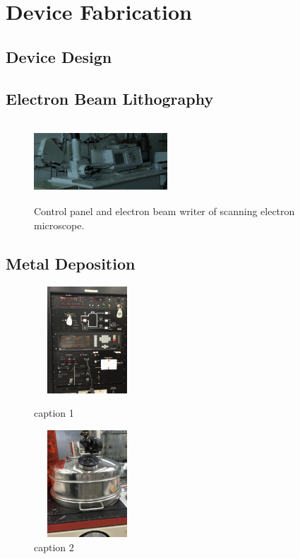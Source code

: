 \section{Device Fabrication}\label{sec:device_fabrication}
\subsection{Device Design}\label{subsec:device_design}
\subsection{Electron Beam Lithography}\label{subsec:lithography}
\begin{figure}[ht]
	\centering
	\includegraphics[height=3cm,width=5cm]{figs/experimental/SEM}
	\caption[Scanning electron microscope]{Control panel and electron beam writer of scanning electron microscope.}
	\label{fig:SEM_machine}
\end{figure}

\subsection{Metal Deposition}\label{subsec:deposition}
\begin{figure}[ht]
	\centering
	\begin{minipage}[b]{0.45\linewidth}
		\centering
		\includegraphics[height=4cm,width=4cm]{figs/experimental/bjd_control_panel}
		\caption[BJD control panel]{caption 1}
		\label{fig:bjd_control_panel}
	\end{minipage}
	\qquad
	\begin{minipage}[b]{0.45\linewidth}
		\centering
		\includegraphics[height=4cm,width=4cm]{figs/experimental/bjd_hood}
		\caption[BJD Hood]{caption 2}
		\label{fig:bjd_hood}
	\end{minipage}
\end{figure}


